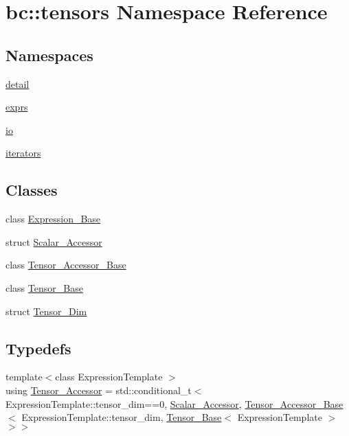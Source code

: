 \hypertarget{namespacebc_1_1tensors}{}\section{bc\+:\+:tensors Namespace Reference}
\label{namespacebc_1_1tensors}
\subsection*{Namespaces}
\begin{DoxyCompactItemize}
\item 
 \hyperlink{namespacebc_1_1tensors_1_1detail}{detail}
\item 
 \hyperlink{namespacebc_1_1tensors_1_1exprs}{exprs}
\item 
 \hyperlink{namespacebc_1_1tensors_1_1io}{io}
\item 
 \hyperlink{namespacebc_1_1tensors_1_1iterators}{iterators}
\end{DoxyCompactItemize}
\subsection*{Classes}
\begin{DoxyCompactItemize}
\item 
class \hyperlink{classbc_1_1tensors_1_1Expression__Base}{Expression\+\_\+\+Base}
\item 
struct \hyperlink{structbc_1_1tensors_1_1Scalar__Accessor}{Scalar\+\_\+\+Accessor}
\item 
class \hyperlink{classbc_1_1tensors_1_1Tensor__Accessor__Base}{Tensor\+\_\+\+Accessor\+\_\+\+Base}
\item 
class \hyperlink{classbc_1_1tensors_1_1Tensor__Base}{Tensor\+\_\+\+Base}
\item 
struct \hyperlink{structbc_1_1tensors_1_1Tensor__Dim}{Tensor\+\_\+\+Dim}
\end{DoxyCompactItemize}
\subsection*{Typedefs}
\begin{DoxyCompactItemize}
\item 
{\footnotesize template$<$class Expression\+Template $>$ }\\using \hyperlink{namespacebc_1_1tensors_ac97d14866c50588a3fd111f362caf9f1}{Tensor\+\_\+\+Accessor} = std\+::conditional\+\_\+t$<$ Expression\+Template\+::tensor\+\_\+dim==0, \hyperlink{structbc_1_1tensors_1_1Scalar__Accessor}{Scalar\+\_\+\+Accessor}, \hyperlink{classbc_1_1tensors_1_1Tensor__Accessor__Base}{Tensor\+\_\+\+Accessor\+\_\+\+Base}$<$ Expression\+Template\+::tensor\+\_\+dim, \hyperlink{classbc_1_1tensors_1_1Tensor__Base}{Tensor\+\_\+\+Base}$<$ Expression\+Template $>$ $>$$>$
\end{DoxyCompactItemize}
